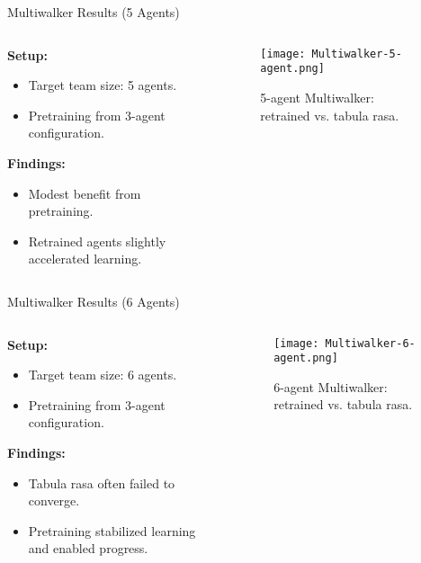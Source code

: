 \begin{frame}{Multiwalker Results (5 Agents)}
    \begin{columns}
        \begin{column}{0.35\linewidth}
            \textbf{Setup:}
            \begin{itemize}
                \item Target team size: 5 agents.
                \item Pretraining from 3-agent configuration.
            \end{itemize}
            \textbf{Findings:}
            \begin{itemize}
                \item Modest benefit from pretraining.
                \item Retrained agents slightly accelerated learning.
            \end{itemize}
        \end{column}
        \begin{column}{0.65\linewidth}
            \begin{figure}
                \texttt{[image: Multiwalker-5-agent.png]}
                \caption{5-agent Multiwalker: retrained vs. tabula rasa.}
            \end{figure}
        \end{column}
    \end{columns}
\end{frame}

\begin{frame}{Multiwalker Results (6 Agents)}
    \begin{columns}
        \begin{column}{0.35\linewidth}
            \textbf{Setup:}
            \begin{itemize}
                \item Target team size: 6 agents.
                \item Pretraining from 3-agent configuration.
            \end{itemize}
            \textbf{Findings:}
            \begin{itemize}
                \item Tabula rasa often failed to converge.
                \item Pretraining stabilized learning and enabled progress.
            \end{itemize}
        \end{column}
        \begin{column}{0.65\linewidth}
            \begin{figure}
                \texttt{[image: Multiwalker-6-agent.png]}
                \caption{6-agent Multiwalker: retrained vs. tabula rasa.}
            \end{figure}
        \end{column}
    \end{columns}
\end{frame}


